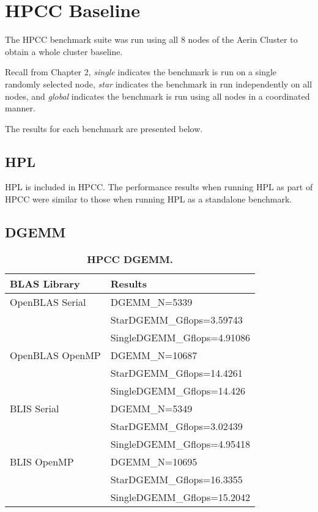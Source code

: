%
%
\section{HPCC Baseline}

The HPCC benchmark suite was run using all 8 nodes of the Aerin Cluster to obtain a whole cluster baseline.

Recall from Chapter 2, \emph{single} indicates the benchmark is run on a single randomly selected node, \emph{star} indicates the benchmark in run independently on all nodes, and \emph{global} indicates the benchmark is run using all nodes in a coordinated manner.

The results for each benchmark are presented below.


%
%
\subsection{HPL}

HPL is included in HPCC. The performance results when running HPL as part of HPCC were similar to those when running HPL as a standalone benchmark.


%
%
\subsection{DGEMM}

\begin{table}[H]
\begin{center}
\begin{tabular}{ |l|l| } 
\hline
\textbf{BLAS Library} & \textbf{Results} \\ 
\hline
OpenBLAS Serial & DGEMM\_N=5339 \\
                & StarDGEMM\_Gflops=3.59743 \\
                & SingleDGEMM\_Gflops=4.91086 \\
\hline
OpenBLAS OpenMP & DGEMM\_N=10687 \\
                & StarDGEMM\_Gflops=14.4261 \\
                & SingleDGEMM\_Gflops=14.426 \\
\hline
BLIS Serial     & DGEMM\_N=5349 \\
                & StarDGEMM\_Gflops=3.02439 \\
                & SingleDGEMM\_Gflops=4.95418 \\
\hline
BLIS OpenMP     & DGEMM\_N=10695 \\
                & StarDGEMM\_Gflops=16.3355 \\
                & SingleDGEMM\_Gflops=15.2042 \\
\hline
\end{tabular}
\end{center}
\caption{\label{tab:table-name}\textbf{HPCC DGEMM.}}
\end{table}

